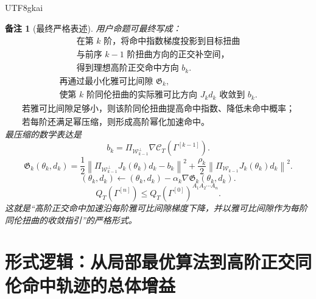 \documentclass[12pt]{article}
\newtheorem{remark}{备注}[section]
\begin{document}
\begin{CJK*}{UTF8}{gkai}
\begin{remark}[最终严格表述]
用户命题可最终写成：
\[
  \boxed{
  \begin{gathered}
  \text{在第 }k\text{ 阶，将命中指数梯度投影到目标扭曲}\\
  \text{与前序 }k-1\text{ 阶扭曲方向的正交补空间，}\\
  \text{得到理想高阶正交命中方向 }b_k.
  \end{gathered}
  }
\]
\[
  \boxed{
  \begin{gathered}
  \text{再通过最小化雅可比间隙 }\mathfrak G_k,\\
  \text{使第 }k\text{ 阶同伦扭曲的实际雅可比方向 }J_kd_k
  \text{ 收敛到 }b_k.
  \end{gathered}
  }
\]
\[
  \boxed{
  \begin{gathered}
  \text{若雅可比间隙足够小，则该阶同伦扭曲提高命中指数、降低未命中概率；}\\
  \text{若每阶还满足幂压缩，则形成高阶幂化加速命中。}
  \end{gathered}
  }
\]
最压缩的数学表达是
\[
  \boxed{
  b_k
  =
  \Pi_{\mathcal W_{k-1}^{\perp}}
  \nabla\mathcal C_T(\Gamma^{[k-1]}).
  }
\]
\[
  \boxed{
  \mathfrak G_k(\theta_k,d_k)
  =
  \frac12
  \left\lVert
  \Pi_{\mathcal W_{k-1}^{\perp}}
  J_k(\theta_k)d_k
  -
  b_k
  \right\rVert^2
  +
  \frac{\rho_k}{2}
  \left\lVert
  \Pi_{\mathcal W_{k-1}}
  J_k(\theta_k)d_k
  \right\rVert^2.
  }
\]
\[
  \boxed{
  (\theta_k,d_k)
  \leftarrow
  (\theta_k,d_k)
  -
  \alpha_k
  \nabla\mathfrak G_k(\theta_k,d_k).
  }
\]
\[
  \boxed{
  Q_T(\Gamma^{[n]})
  \le
  Q_T(\Gamma^{[0]})^{A_1A_2\cdots A_n}.
  }
\]
这就是“高阶正交命中加速沿每阶雅可比间隙梯度下降，并以雅可比间隙作为每阶同伦扭曲的收敛指引”的严格形式。
\end{remark}

\clearpage

\section{形式逻辑：从局部最优算法到高阶正交同伦命中轨迹的总体增益}
\label{sec:tex55-overall-gain-evaluation}


\end{CJK*}
\end{document}

